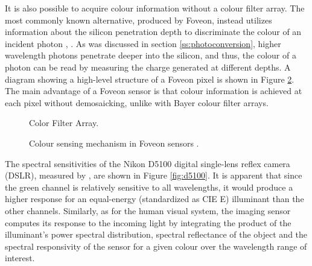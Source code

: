 It is also possible to acquire colour information without a colour filter array. The most commonly known alternative, produced by Foveon, instead utilizes information about the silicon penetration depth to discriminate the colour of an incident photon \cite{lyon2002eyeing}, \cite{hubel2005foveon}. As was discussed in section \ref{ss:photoconversion}, higher wavelength photons penetrate deeper into the silicon, and thus, the colour of a photon can be read by measuring the charge generated at different depths. A diagram showing a high-level structure of a Foveon pixel is shown in Figure \ref{fig:foveon}. The main advantage of a Foveon sensor is that colour information is achieved at each pixel without demosaicking, unlike with Bayer colour filter arrays.

\begin{figure}
\centering

\caption{Color Filter Array.}
\label{fig:cfa}
\end{figure}

\begin{figure}
    \centering
    \caption{Colour sensing mechanism in Foveon sensors \cite{foveon}.}
    \label{fig:foveon}
\end{figure}


 The spectral sensitivities of the Nikon D5100 digital single-lens reflex camera (DSLR), measured by \citeauthor{D5100NPL}, are shown in Figure  \ref{fig:d5100}. It is apparent that since the green channel is relatively sensitive to all wavelengths, it would produce a higher response for an equal-energy (standardized as CIE E) illuminant than the other channels. Similarly, as for the human visual system, the imaging sensor computes its response to the incoming light by integrating the product of the illuminant's power spectral distribution, spectral reflectance of the object and the spectral responsivity of the sensor for a given colour over the wavelength range of interest.

